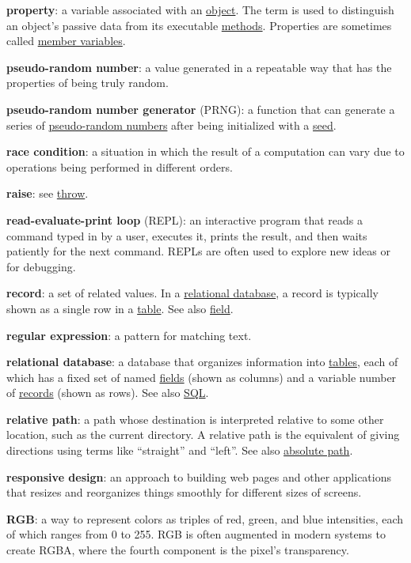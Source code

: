 \textbf{property}: a variable associated with an
\protect\hyperlink{g:object}{object}. The term is used to distinguish an
object's passive data from its executable
\protect\hyperlink{g:method}{methods}. Properties are sometimes called
\protect\hyperlink{g:member-variable}{member variables}.

\textbf{pseudo-random number}: a value generated in a repeatable way
that has the properties of being truly random.

\textbf{pseudo-random number generator} (PRNG): a function that can
generate a series of
\protect\hyperlink{g:pseudo-random-number}{pseudo-random numbers} after
being initialized with a \protect\hyperlink{g:seed}{seed}.

\textbf{race condition}: a situation in which the result of a
computation can vary due to operations being performed in different
orders.

\textbf{raise}: see \protect\hyperlink{g:throw}{throw}.

\textbf{read-evaluate-print loop} (REPL): an interactive program that
reads a command typed in by a user, executes it, prints the result, and
then waits patiently for the next command. REPLs are often used to
explore new ideas or for debugging.

\textbf{record}: a set of related values. In a
\protect\hyperlink{g:relational-database}{relational database}, a record
is typically shown as a single row in a
\protect\hyperlink{g:table}{table}. See also
\protect\hyperlink{g:field}{field}.

\textbf{regular expression}: a pattern for matching text.

\textbf{relational database}: a database that organizes information into
\protect\hyperlink{g:table}{tables}, each of which has a fixed set of
named \protect\hyperlink{g:field}{fields} (shown as columns) and a
variable number of \protect\hyperlink{g:record}{records} (shown as
rows). See also \protect\hyperlink{g:sql}{SQL}.

\textbf{relative path}: a path whose destination is interpreted relative
to some other location, such as the current directory. A relative path
is the equivalent of giving directions using terms like ``straight'' and
``left''. See also \protect\hyperlink{g:absolute-path}{absolute path}.

\textbf{responsive design}: an approach to building web pages and other
applications that resizes and reorganizes things smoothly for different
sizes of screens.

\textbf{RGB}: a way to represent colors as triples of red, green, and
blue intensities, each of which ranges from 0 to 255. RGB is often
augmented in modern systems to create RGBA, where the fourth component
is the pixel's transparency.

